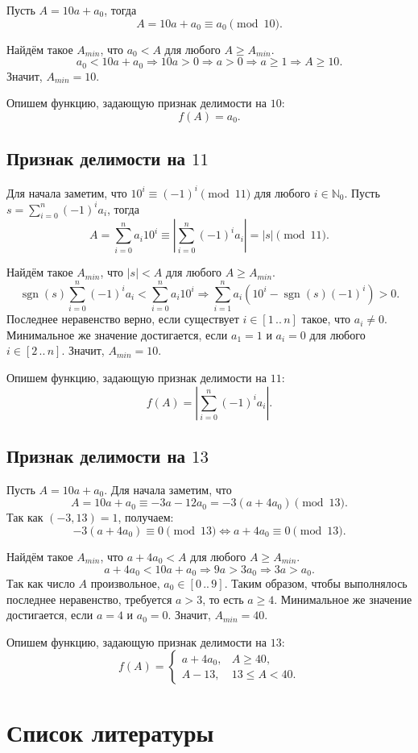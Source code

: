 \documentclass[14pt, a4paper]{extarticle}
\theoremstyle{definition}
\DeclareMathOperator{\sgn}{sgn}
\begin{document}
	Пусть $A=10a+a_0$, тогда
	$$A=10a+a_0\equiv a_0\pmod{10}.$$

	Найдём такое $A_{min}$, что $a_0<A$ для любого $A\geqslant A_{min}$. 
	$$a_0<10a+a_0\Rightarrow10a>0\Rightarrow a>0\Rightarrow a\geqslant1\Rightarrow A\geqslant10.$$
	Значит, $A_{min}=10$.

	Опишем функцию, задающую признак делимости на $10$:
	$$f(A)=a_0.$$

\subsection{Признак делимости на $11$}
	
	Для начала заметим, что $10^i\equiv(-1)^i\pmod{11}$ для любого $i\in\mathbb{N}_0$. Пусть $s=\sum_{i=0}^n(-1)^ia_i$, тогда
	$$A=\sum_{i=0}^na_i10^i\equiv\left|\sum_{i=0}^n(-1)^ia_i\right|=|s|\pmod{11}.$$

	Найдём такое $A_{min}$, что $|s|<A$ для любого $A\geqslant A_{min}$. 
	$$\sgn(s)\sum_{i=0}^n(-1)^ia_i<\sum_{i=0}^na_i10^i\Rightarrow\sum_{i=1}^na_i(10^i-\sgn(s)(-1)^i)>0.$$
	Последнее неравенство верно, если существует $i\in[1\,..\,n]$ такое, что $a_i\neq0$. Минимальное же значение достигается, если $a_1=1$ и $a_i=0$ для любого $i\in[2\,..\,n]$. Значит, $A_{min}=10$.

	Опишем функцию, задающую признак делимости на $11$:
	$$f(A)=\left|\sum_{i=0}^n(-1)^ia_i\right|.$$

\subsection{Признак делимости на $13$}
	
	Пусть $A=10a+a_0$. Для начала заметим, что
	$$A=10a+a_0\equiv-3a-12a_0=-3(a+4a_0)\pmod{13}.$$
	Так как $(-3,13)=1$, получаем:
	$$\boxed{-3(a+4a_0)\equiv0\pmod{13}\Leftrightarrow a+4a_0\equiv0\pmod{13}}.$$

	Найдём такое $A_{min}$, что $a+4a_0<A$ для любого $A\geqslant A_{min}$. 
	$$a+4a_0<10a+a_0\Rightarrow9a>3a_0\Rightarrow3a>a_0.$$
	Так как число $A$ произвольное, $a_0\in[0\,..\,9]$. Таким образом, чтобы выполнялось последнее неравенство, требуется $a>3$, то есть $a\geqslant4$. Минимальное же значение достигается, если $a=4$ и $a_0=0$. Значит, $A_{min}=40$.

	Опишем функцию, задающую признак делимости на $13$:
	$$f(A)=\begin{cases}
		a+4a_0,&A\geqslant40,\\
		A-13,&13\leqslant A<40.
	\end{cases}$$

\newpage
\section{Список литературы}
\end{document}
